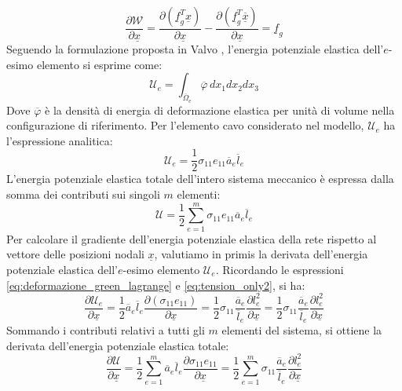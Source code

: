 \begin{equation}
   \frac{\partial \mathcal{W}}{\partial \underline{x}} = \frac{\partial (\underline{f}_g^T \underline{x})}{\partial \underline{x}} - \frac{\partial (\underline{f}_g^T \overline{\underline{x}})}{\partial \underline{x}} = \underline{f}_g
\end{equation}
Seguendo la formulazione proposta in Valvo \cite{Valvo1,Valvo2}, l'energia potenziale elastica dell'$e$-esimo elemento si esprime come:
\begin{equation}
   \mathcal{U}_e = \int_{\overline{\Omega}_e} \overline{\varphi}\, dx_1 dx_2 dx_3
\end{equation}
Dove $\overline{\varphi}$ è la densità di energia di deformazione elastica per unità di volume nella configurazione di riferimento. Per l'elemento cavo considerato nel modello, $\mathcal{U}_e$ ha l'espressione analitica: 
\begin{equation}
   \mathcal{U}_e = \frac{1}{2} \sigma_{11} e_{11} \overline{a}_e \overline{l}_e
\end{equation}
L'energia potenziale elastica totale dell'intero sistema meccanico è espressa dalla somma dei contributi sui singoli $m$ elementi: 
\begin{equation}
   \mathcal{U} = \frac{1}{2} \sum_{e=1}^{m} \sigma_{11} e_{11} \overline{a}_e \overline{l}_e
   \label{eq:energia_potenziale_elastica}
\end{equation}
Per calcolare il gradiente dell'energia potenziale elastica della rete rispetto al vettore delle posizioni nodali $\underline{x}$, valutiamo in primis la derivata dell'energia potenziale elastica dell'$e$-esimo elemento $\mathcal{U}_e$. Ricordando le espressioni \eqref{eq:deformazione_green_lagrange} e \eqref{eq:tension_only2}, si ha:
\begin{equation}
   \frac{\partial \mathcal{U}_e}{\partial \underline{x}} = \frac{1}{2} \overline{a}_e \overline{l}_e \frac{\partial (\sigma_{11} e_{11})}{\partial {\underline{x}}} = \frac{1}{2} \sigma_{11} \frac{\overline{a}_e}{\overline{l}_e} \frac{\partial l_e^2}{\partial {\underline{x}}} = \frac{1}{2} \sigma_{11} \frac{\overline{a}_e}{\overline{l}_e} \frac{\partial l_e^2}{\partial {\underline{x}}}
\end{equation}
Sommando i contributi relativi a tutti gli $m$ elementi del sistema, si ottiene la derivata dell'energia potenziale elastica totale:
\begin{equation}
   \frac{\partial \mathcal{U}}{\partial {\underline{x}}} = \frac{1}{2} \sum_{e=1}^{m} \overline{a}_e \overline{l}_e \frac{\partial {\sigma_{11} e_{11}}}{\partial {\underline{x}}} = \frac{1}{2} \sum_{e=1}^{m} \sigma_{11} \frac{\overline{a}_e}{\overline{l}_e} \frac{\partial l_e^2}{\partial {\underline{x}}}
   \label{eq:derivata_energia_potenziale_elastica}
\end{equation}
